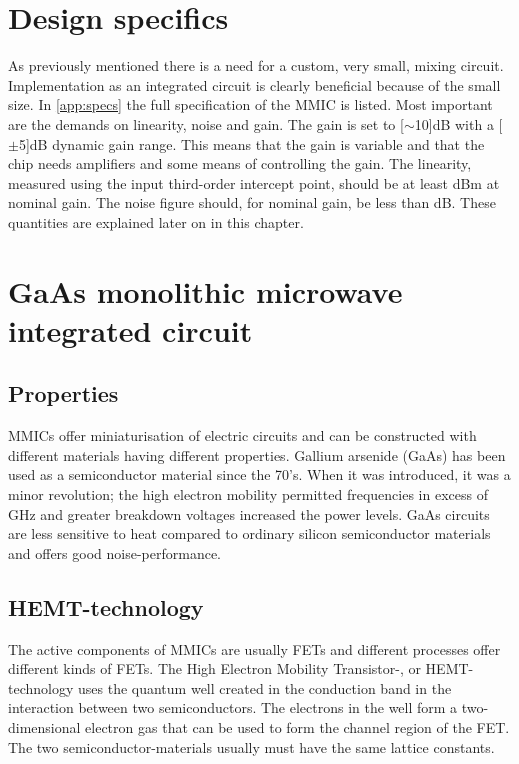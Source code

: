	\section{Design specifics}
		As previously mentioned there is a need for a custom, very small, mixing circuit. Implementation as an integrated circuit is clearly beneficial because of the small size. In \autoref{app:specs} the full specification of the MMIC is listed. Most important are the demands on linearity, noise and gain. The gain is set to \unit[$\sim$10]{dB} with a \unit[$\pm$5]{dB} dynamic gain range. This means that the gain is variable and that the chip needs amplifiers and some means of controlling the gain. The linearity, measured using the input third-order intercept point, should be at least \unit[15]{dBm} at nominal gain. The noise figure should, for nominal gain, be less than \unit[15]{dB}. These quantities are explained later on in this chapter.


	\section{GaAs monolithic microwave integrated cir\-cuit}
		\subsection{Properties}

		MMICs offer miniaturisation of electric circuits and can be constructed with different materials having different properties. Gallium arsenide (GaAs) has been used as a semiconductor material since the 70's. When it was introduced, it was a minor revolution; the high electron mobility permitted frequencies in excess of \unit[200]{GHz} and greater breakdown voltages increased the power levels. GaAs circuits are less sensitive to heat compared to ordinary silicon semiconductor materials and offers good noise-performance.\autocite{robertson95} %

		\subsection{HEMT-technology}
			The active components of MMICs are usually FETs and different processes offer different kinds of FETs.	The High Electron Mobility Transistor-, or HEMT-technology uses the quantum well created in the conduction band in the interaction between two semiconductors. The electrons in the well form a two-dimensional electron gas that can be used to form the channel region of the FET.\autocite{mimura80} The two semiconductor-materials usually must have the same lattice constants.

